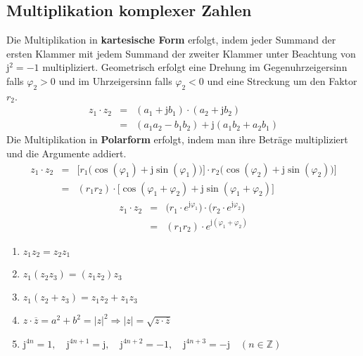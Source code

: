 \subsection{Multiplikation komplexer Zahlen}
Die Multiplikation in \textbf{kartesische Form} erfolgt, indem jeder Summand der ersten Klammer mit jedem Summand der zweiter Klammer unter Beachtung von $\text{j}^2=-1$ multipliziert. Geometrisch erfolgt eine Drehung im Gegenuhrzeigersinn falls $\varphi_2>0$ und im Uhrzeigersinn falls $\varphi_2<0$ und eine Streckung um den Faktor $r_2$.
\begin{equation}
\boxed{\begin{array}{lll}
z_1\cdot z_2&=&\left(a_1+\text{j}b_1\right)\cdot \left(a_2+\text{j}b_2\right)\\
&=&\left(a_1a_2-b_1b_2\right)+\text{j}\left(a_1b_2+a_2b_1\right)
\end{array}}
\end{equation}
Die Multiplikation in \textbf{Polarform} erfolgt, indem man ihre Beträge multipliziert und die Argumente addiert.
\begin{equation}
\boxed{\begin{array}{lll}
z_1\cdot z_2&=&\Big[r_1\Big(\cos\left(\varphi_1\right)+\text{j}\sin\left(\varphi_1\right)\Big)\Big]\cdot r_2\Big(\cos\left(\varphi_2\right)+\text{j}\sin\left(\varphi_2\right)\Big)\Big]\\
&=&\left(r_1r_2\right)\cdot \Big[\cos\left(\varphi_1+\varphi_2\right)+\text{j}\sin\left(\varphi_1+\varphi_2\right)\Big]
\end{array}}
\end{equation}
\begin{equation}
\boxed{\begin{array}{lll}
z_1\cdot z_2&=&\Big(r_1\cdot e^{\text{j}\varphi_1}\Big)\cdot \Big(r_2\cdot e^{\text{j}\varphi_2}\Big)\\
&=&\left(r_1r_2\right)\cdot e^{\text{j}\left(\varphi_1+\varphi_2\right)}
\end{array}}
\end{equation}
\begin{enumerate}[$(i)$]
\item $z_1z_2=z_2z_1$
\item $z_1\left(z_2z_3\right)=\left(z_1z_2\right)z_3$
\item $z_1\left(z_2+z_3\right)=z_1z_2+z_1z_3$
\item $z\cdot \overline{z}=a^2+b^2=\Big\vert z\Big\vert^2\Longrightarrow \Big\vert z\Big\vert=\sqrt{z\cdot \overline{z}}$
\item $\text{j}^{4n}=1,\quad \text{j}^{4n+1}=\text{j},\quad \text{j}^{4n+2}=-1,\quad \text{j}^{4n+3}=-\text{j}\quad \left(n\in \mathbb{Z}\right)$
\end{enumerate}
